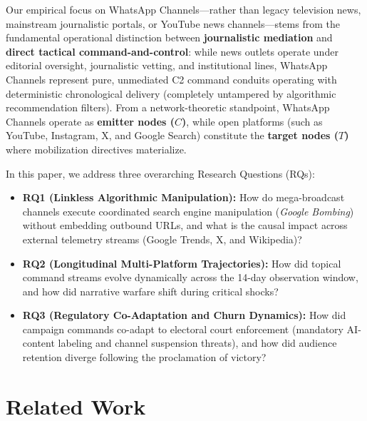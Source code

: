 \documentclass[preprint,12pt]{elsarticle}
\begin{document}
Our empirical focus on WhatsApp Channels---rather than legacy television news, mainstream journalistic portals, or YouTube news channels---stems from the fundamental operational distinction between \textbf{journalistic mediation} and \textbf{direct tactical command-and-control}: while news outlets operate under editorial oversight, journalistic vetting, and institutional lines, WhatsApp Channels represent pure, unmediated C2 command conduits operating with deterministic chronological delivery (completely untampered by algorithmic recommendation filters). From a network-theoretic standpoint, WhatsApp Channels operate as \textbf{emitter nodes ($C$)}, while open platforms (such as YouTube, Instagram, X, and Google Search) constitute the \textbf{target nodes ($T$)} where mobilization directives materialize.

In this paper, we address three overarching Research Questions (RQs):
\begin{itemize}
    \item \textbf{RQ1 (Linkless Algorithmic Manipulation):} How do mega-broadcast channels execute coordinated search engine manipulation (\textit{Google Bombing}) without embedding outbound URLs, and what is the causal impact across external telemetry streams (Google Trends, X, and Wikipedia)?
    \item \textbf{RQ2 (Longitudinal Multi-Platform Trajectories):} How did topical command streams evolve dynamically across the 14-day observation window, and how did narrative warfare shift during critical shocks?
    \item \textbf{RQ3 (Regulatory Co-Adaptation and Churn Dynamics):} How did campaign commands co-adapt to electoral court enforcement (mandatory AI-content labeling and channel suspension threats), and how did audience retention diverge following the proclamation of victory?
\end{itemize}

\section{Related Work}\label{sec:related}
\end{document}
